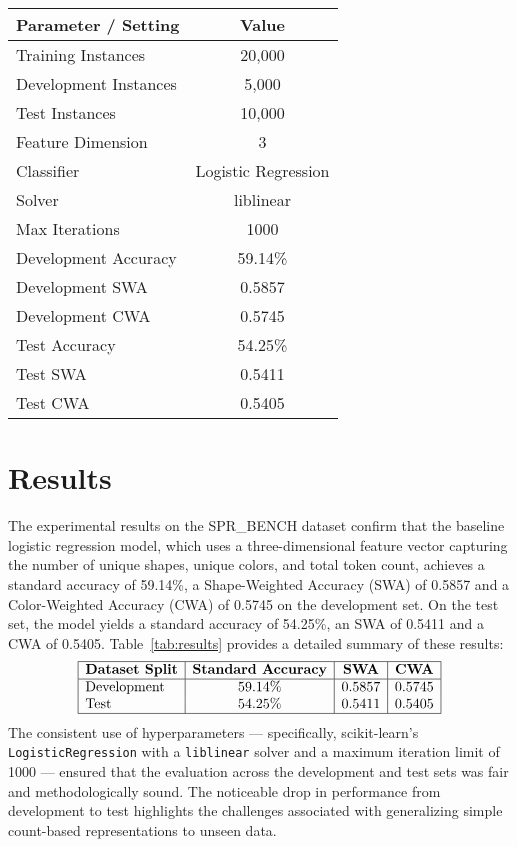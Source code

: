 \documentclass{article}
\begin{document}
\begin{table}[h]
\centering
\begin{tabular}{|l|c|}
\hline
\textbf{Parameter / Setting} & \textbf{Value} \\ \hline
Training Instances & 20,000 \\ \hline
Development Instances & 5,000 \\ \hline
Test Instances & 10,000 \\ \hline
Feature Dimension & 3 \\ \hline
Classifier & Logistic Regression \\ \hline
Solver & liblinear \\ \hline
Max Iterations & 1000 \\ \hline
Development Accuracy & 59.14\% \\ \hline
Development SWA & 0.5857 \\ \hline
Development CWA & 0.5745 \\ \hline
Test Accuracy & 54.25\% \\ \hline
Test SWA & 0.5411 \\ \hline
Test CWA & 0.5405 \\ \hline
\end{tabular}
\label{tab:exp_settings}
\end{table}

\section{Results}
\noindent The experimental results on the SPR\_BENCH dataset confirm that the baseline logistic regression model, which uses a three-dimensional feature vector capturing the number of unique shapes, unique colors, and total token count, achieves a standard accuracy of 59.14\%, a Shape-Weighted Accuracy (SWA) of 0.5857 and a Color-Weighted Accuracy (CWA) of 0.5745 on the development set. On the test set, the model yields a standard accuracy of 54.25\%, an SWA of 0.5411 and a CWA of 0.5405.
\noindent Table~\ref{tab:results} provides a detailed summary of these results:
\[
\begin{array}{|l|c|c|c|}
\hline
\textbf{Dataset Split} & \textbf{Standard Accuracy} & \textbf{SWA} & \textbf{CWA} \\
\hline
\text{Development} & 59.14\% & 0.5857 & 0.5745 \\
\text{Test} & 54.25\% & 0.5411 & 0.5405 \\
\hline
\end{array}
\]
The consistent use of hyperparameters --- specifically, scikit-learn's \texttt{LogisticRegression} with a \texttt{liblinear} solver and a maximum iteration limit of 1000 --- ensured that the evaluation across the development and test sets was fair and methodologically sound. The noticeable drop in performance from development to test highlights the challenges associated with generalizing simple count-based representations to unseen data.
\end{document}
